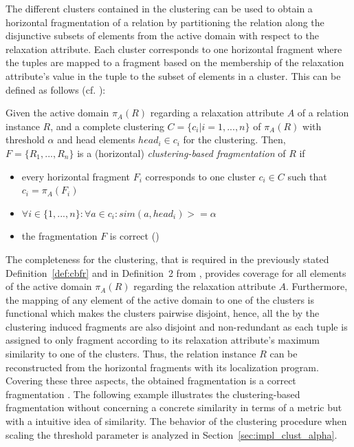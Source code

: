The different clusters contained in the clustering can be used to obtain a horizontal fragmentation of a relation by partitioning the relation along the 
disjunctive subsets of elements from the active domain with respect to the relaxation attribute. Each cluster corresponds to one horizontal fragment where
the tuples are mapped to a fragment based on the membership of the relaxation attribute's value in the tuple to the subset of elements in a cluster. This 
can be defined as follows (cf. \citet[Definition~2]{Wiese2014}):

\begin{definition} \label{def:cbfr}
Given the active domain $\pi_A(R)$ regarding a relaxation attribute $A$ of a relation instance $R$, and a complete clustering $C=\{c_i|i=1,...,n\}$
of $\pi_A(R)$ with threshold $\alpha$ and head elements $head_i \in c_i$ for the clustering. Then, $F=\{R_1,...,R_n\}$ is a (horizontal) 
\emph{clustering-based fragmentation} of $R$ if
\begin{itemize}
    \item every horizontal fragment $F_i$ corresponds to one cluster $c_i \in C$ such that $c_i=\pi_A(F_i)$
    \item $\forall i \in \{1,...,n\}: \forall a \in c_i: sim(a, head_i)>=\alpha$
    \item the fragmentation $F$ is correct (\cite[p.~103]{Ozsu1991})
\end{itemize}
\end{definition}

The completeness for the clustering, that is required in the previously stated Definition~\ref{def:cbfr} and in Definition~2 from \cite{Wiese2014},
provides coverage for all elements of the active domain $\pi_A(R)$ regarding the relaxation attribute $A$. Furthermore, the mapping of any element of the
active domain to one of the clusters is functional which makes the clusters pairwise disjoint, hence, all the by the clustering induced fragments are also
disjoint and non-redundant as each tuple is assigned to only fragment according to its relaxation attribute's maximum similarity to one of the clusters.
Thus, the relation instance $R$ can be reconstructed from the horizontal fragments with its localization program. Covering these three aspects, the
obtained fragmentation is a correct fragmentation \cite[p.~103]{Ozsu1991}. The following example illustrates the clustering-based fragmentation without
concerning a concrete similarity in terms of a metric but with a intuitive idea of similarity. The behavior of the clustering procedure when scaling the
threshold parameter is analyzed in Section~\ref{sec:impl_clust_alpha}.

